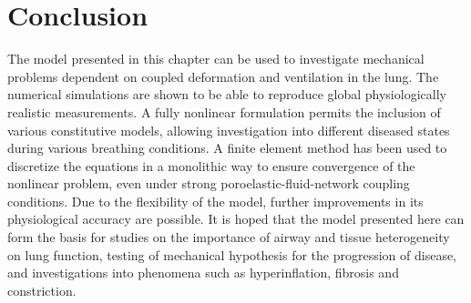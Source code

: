 \section{Conclusion}
%
The model presented in this chapter can be used to investigate mechanical problems dependent on coupled deformation and ventilation in the lung.
%
The numerical simulations are shown to be able to reproduce global physiologically realistic measurements. A fully nonlinear formulation permits the inclusion of various constitutive models, allowing investigation into different diseased states during various breathing conditions. A finite element method has been used to discretize the equations in a monolithic way to ensure convergence of the nonlinear problem, even under strong poroelastic-fluid-network coupling conditions. Due to the flexibility of the model, further improvements in its physiological accuracy are possible. It is hoped that the model presented here can form the basis for studies on the importance of airway and tissue heterogeneity on lung function, testing of mechanical hypothesis for the progression of disease, and investigations into phenomena such as hyperinflation, fibrosis and constriction.



